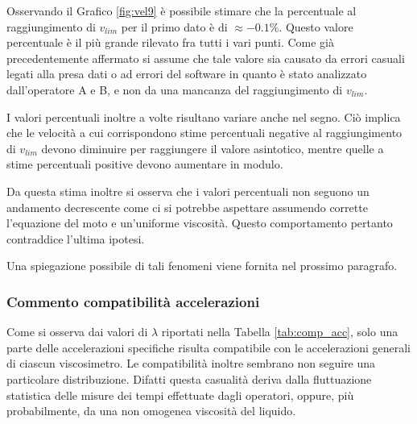 \documentclass[a4paper,11pt,oneside]{article}
\begin{document}

Osservando il Grafico \ref{fig:vel9} è possibile stimare che la percentuale al raggiungimento di $v_{lim}$ per il primo dato è di $\approx -0.1\%$. Questo valore percentuale è il più grande rilevato fra tutti i vari punti. Come già precedentemente affermato si assume che tale valore sia causato da errori casuali legati alla presa dati o ad errori del software in quanto è stato analizzato dall'operatore A e B, e non da una mancanza del raggiungimento di $v_{lim}$.\newline

I valori percentuali inoltre a volte risultano variare anche nel segno. Ciò implica che le velocità a cui corrispondono stime percentuali negative al raggiungimento di $v_{lim}$ devono diminuire per raggiungere il valore asintotico, mentre quelle a stime percentuali positive devono aumentare in modulo. 

Da questa stima inoltre si osserva che i valori percentuali non seguono un andamento decrescente come ci si potrebbe aspettare assumendo corrette l'equazione del moto e un'uniforme viscosità. Questo comportamento pertanto contraddice l'ultima ipotesi.\newline

Una spiegazione possibile di tali fenomeni viene fornita nel prossimo paragrafo. \newline

\subsubsection*{Commento compatibilità accelerazioni}
Come si osserva dai valori di $\lambda$ riportati nella Tabella \ref{tab:comp_acc}, solo una parte delle accelerazioni specifiche risulta compatibile con le accelerazioni generali di ciascun viscosimetro.
Le compatibilità inoltre sembrano non seguire una particolare distribuzione. Difatti questa casualità deriva dalla fluttuazione statistica delle misure dei tempi effettuate dagli operatori, oppure, più probabilmente, da una non omogenea viscosità del liquido.\newline
\end{document}
